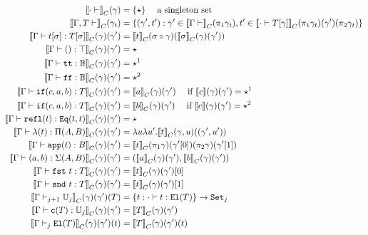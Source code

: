 \begin{align*}
  \denotesC{\goodCtx{\cdot}{}}(\gm) &= \{\star\} \quad \text{  a singleton set } \\ 
  \denotesC{\goodCtx{\Gm, T}{}}(\gm_t) &= \{ (\gamma' , t') : \gm' \in \denotesC{\goodCtx{\Gm}{}}(\pi_1 \gm_t), t' \in \denotesC{\goodType{\cdot}{\sub{T}{\gm}}{}}(\pi_1 \gm_t)(\gm')(\pi_2 \gm_t)  \} \\
  \denotesC{\goodTerm{\Gm}{\sub{t}{\sigma}}{\sub{T}{\sigma}}}(\gm)(\gm') &= \denotesC{t}(\sigma \circ \gm)(\denotesC{\sigma}(\gm)(\gm')) \\
  \denotesC{\goodTerm{\Gm}{\unit}{\top}}(\gm)(\gm') &= \star\\
  \denotesC{\goodTerm{\Gm}{\true}{\cB}}(\gm)(\gm') &= \star^1 \\
  \denotesC{\goodTerm{\Gm}{\false}{\cB}}(\gm)(\gm') &= \star^2 \\
  \denotesC{\goodTerm{\Gm}{\ifb{c}{a}{b}}{T}}(\gm)(\gm') &= \denotesC{a}(\gm)(\gm') \quad \text{ if } \denotes{c}(\gm)(\gm') = \star^1 \\
  \denotesC{\goodTerm{\Gm}{\ifb{c}{a}{b}}{T}}(\gm)(\gm') &= \denotesC{b}(\gm)(\gm') \quad \text{ if } \denotes{c}(\gm)(\gm') = \star^2 \\
  \denotesC{\goodTerm{\Gm}{\eqrefl{t}}{\TyId{t}{t}}}(\gm)(\gm') &= \star\\
  \denotesC{\goodTerm{\Gm}{\lam{t}}{\TyPi{A}{B}}}(\gm)(\gm') &= \lambda u \lambda u' . \denotesC{t}(\SubstExt{\gm}{u}) ((\gm' , u')) \\
  \denotesC{\goodTerm{\Gm}{\app{t}}{B}}(\gm)(\gm') &= \denotesC{t}(\pi_1 \gm)(\gm'[0])(\pi_2 \gm)(\gm'[1]) \\
  \denotesC{\goodTerm{\Gm}{\pair{a}{b}}{\TySigma{A}{B}}}(\gm)(\gm') &= (\denotesC{a}(\gm)(\gm') , \denotesC{b}(\gm)(\gm') )\\
  \denotesC{\goodTerm{\Gm}{\fst{t}}{T}}(\gm)(\gm') &= \denotesC{t}(\gm)(\gm')[0] \\
  \denotesC{\goodTerm{\Gm}{\snd{t}}{T}}(\gm)(\gm') &= \denotesC{t}(\gm)(\gm')[1]\\
  \denotesC{\goodType{\Gm}{\cU_j}{j+1}}(\gm)(\gm')(T) &= \{t : \goodTerm{\cdot}{t}{\El{T}}\}  \to \Set{j} \\
  \denotesC{\goodTerm{\Gm}{\codety{T}}{\cU_j}}(\gm)(\gm') &= \denotesC{T}(\gm)(\gm') \\ 
  \denotesC{\goodType{\Gm}{\El{T}}{j}}(\gm)(\gm')(t) &= \denotesC{T}(\gm)(\gm')(t) \\
\end{align*}

